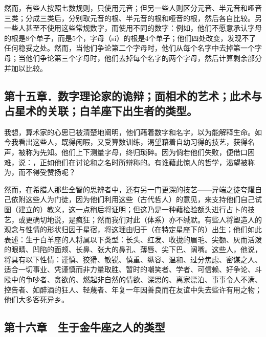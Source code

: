 然而，有些人按照七数规则，只使用元音；但另一些人则区分元音、半元音和哑音三类；分成三类后，分别取元音的根、半元音的根和哑音的根，然后各自比较。另一些人甚至不使用这些常规数字，而使用不同的数字：例如，他们不愿意承认字母的根是8个单子，而是5个，字母（si）的根是4个单子；他们四处改变，发现不了任何稳妥之处。然而，当他们争论第二个字母时，他们从每个名字中去掉第一个字母；当他们争论第三个字母时，他们去掉每个名字的两个字母，然后计算剩余部分并加以比较。\par


\subsection{第十五章．数字理论家的诡辩；面相术的艺术；此术与占星术的关联；白羊座下出生者的类型。}

我想，算术家的心思已被清楚地阐明，他们藉着数字和名字，以为能解释生命。如今我看出这些人，既得闲暇，又受算数训练，渴望藉着自幼习得的技艺，获得名声，被称为先知。他们上下测量字母，终归琐碎。因为倘若他们失败，便借口困难，说：，正如他们在讨论和之名时所辩称的。有谁藉此惊人的哲学，渴望被称为，而不得受赞扬呢？\par

然而，在希腊人那些全智的思辨者中，还有另一门更深的技艺——异端之徒夸耀自己依附这些人为门徒，因为他们利用这些（古代哲人）的意见，来支持他们自己试图（建立的）教义，这一点稍后将证明；但这乃是一种藉检验额头进行占卜的技艺，或更确切地说，是疯狂；然而我们对此（体系）亦不缄默。有些人将塑造人的观念与性情的形状归因于星宿，将这理由归于（在特定星座下的）出生；他们如此表述：生于白羊座的人将属以下类型：长头、红发、收拢的眉毛、尖额、灰而活泼的眼睛、凹陷的面颊、长鼻、张大的鼻孔、薄唇、尖下巴、阔嘴。这些人，他说，将具有以下性情：谨慎、狡猾、敏锐、慎重、纵容、温和、过分焦虑、密谋之人、适合一切事业、凭谨慎而非力量取胜、暂时的嘲笑者、学者、可信赖、好争论、斗殴中的争吵者、贪欲的、燃起非自然的情欲、深思的、离家漂泊、事事令人不满、控告者、如醉酒的狂人、轻蔑者、年复一年因善良而在友谊中失去些许有用之物；他们大多客死异乡。\par


\subsection{第十六章　生于金牛座之人的类型}

